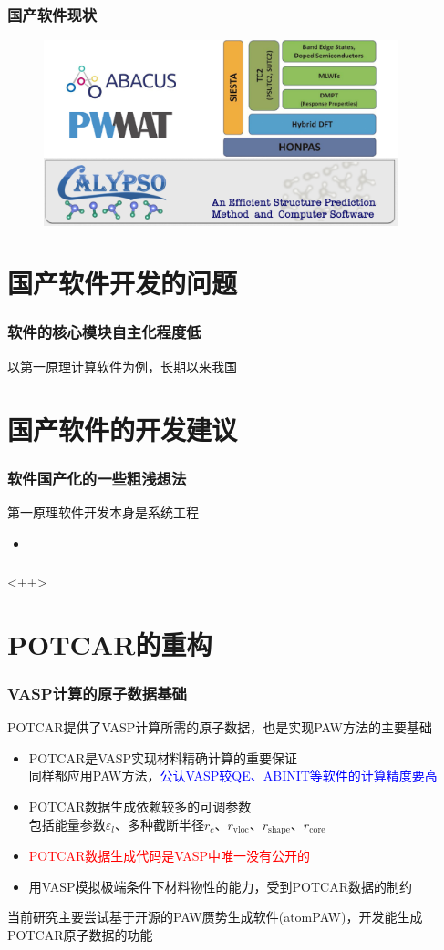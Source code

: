 \documentclass[cjk,slidestop,compress,mathserif,blue]{beamer}
\begin{document}
\frame
{
	\frametitle{国产软件现状}
\begin{figure}[h!]
\centering
\includegraphics[width=4.05in]{Figures/Softwares_China-logo.png}
\label{Software-China}
\end{figure}
}

\section{国产软件开发的问题}
\frame
{
	\frametitle{软件的核心模块自主化程度低}
	以第一原理计算软件为例，长期以来我国
}

\section{国产软件的开发建议}
\frame
{
	\frametitle{软件国产化的一些粗浅想法}
第一原理软件开发本身是系统工程
	\begin{itemize}
		\item 
	\end{itemize}
}

\frame
{
	\frametitle{}<++>
}

\section{\rm{POTCAR}的重构}
\frame
{
	\frametitle{\textrm{VASP}计算的原子数据基础}
	\textrm{POTCAR}提供了\textrm{VASP}计算所需的原子数据，也是实现\textrm{PAW}方法的主要基础
	\begin{itemize}
		\item \textrm{POTCAR}是\textrm{VASP}实现材料精确计算的重要保证\\
			同样都应用\textrm{PAW}方法，\textcolor{blue}{公认\textrm{VASP}较\textrm{QE}、\textrm{ABINIT}等软件的计算精度要高}
		\item \textrm{POTCAR}数据生成依赖较多的可调参数\\
			包括能量参数$\varepsilon_l$、多种截断半径$r_c$、$r_{\mathrm{vloc}}$、$r_{\mathrm{shape}}$、$r_{\mathrm{core}}$
		\item \textcolor{red}{\textrm{POTCAR}数据生成代码是\textrm{VASP}中唯一没有公开的}
		\item 用\textrm{VASP}模拟极端条件下材料物性的能力，受到\textrm{POTCAR}数据的制约
	\end{itemize}

当前研究主要尝试基于开源的\textrm{PAW}赝势生成软件(\textrm{atomPAW})，开发能生成\textrm{POTCAR}原子数据的功能
}
\end{document}
